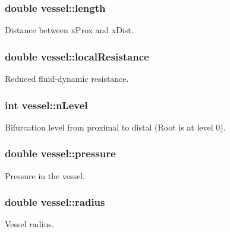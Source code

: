 \subsubsection[{\texorpdfstring{length}{length}}]{\setlength{\rightskip}{0pt plus 5cm}double vessel\+::length}\hypertarget{structvessel_a1336113e8af54e746e2b57ea4b4055d2}{}\label{structvessel_a1336113e8af54e746e2b57ea4b4055d2}
Distance between x\+Prox and x\+Dist. 
\subsubsection[{\texorpdfstring{local\+Resistance}{localResistance}}]{\setlength{\rightskip}{0pt plus 5cm}double vessel\+::local\+Resistance}\hypertarget{structvessel_aecef2a9ca74e4f42446c97b1e2d5ba9f}{}\label{structvessel_aecef2a9ca74e4f42446c97b1e2d5ba9f}
Reduced fluid-\/dynamic resistance. 
\subsubsection[{\texorpdfstring{n\+Level}{nLevel}}]{\setlength{\rightskip}{0pt plus 5cm}int vessel\+::n\+Level}\hypertarget{structvessel_a40fb8bafbcd5654dc9bb48d49c97623a}{}\label{structvessel_a40fb8bafbcd5654dc9bb48d49c97623a}
Bifurcation level from proximal to distal (Root is at level 0). 
\subsubsection[{\texorpdfstring{pressure}{pressure}}]{\setlength{\rightskip}{0pt plus 5cm}double vessel\+::pressure}\hypertarget{structvessel_aa4e3a943682104860826bc33f582b2a1}{}\label{structvessel_aa4e3a943682104860826bc33f582b2a1}
Pressure in the vessel. 
\subsubsection[{\texorpdfstring{radius}{radius}}]{\setlength{\rightskip}{0pt plus 5cm}double vessel\+::radius}\hypertarget{structvessel_a9bbe9528519d0df7931d2d3665ba45a6}{}\label{structvessel_a9bbe9528519d0df7931d2d3665ba45a6}
Vessel radius. 
